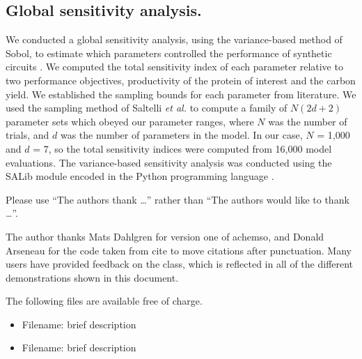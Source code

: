 \documentclass[journal=asbcd6,manuscript=article]{achemso}
\begin{document}
\subsection*{Global sensitivity analysis.}
We conducted a global sensitivity analysis, using the variance-based method of Sobol, to estimate which parameters controlled the performance of synthetic circuits \citep{SOBOL_METHOD}.
We computed the total sensitivity index of each parameter relative to two performance objectives, productivity of the protein of interest and the carbon yield.
We established the sampling bounds for each parameter from literature.
We used the sampling method of Saltelli \textit{et al.} \citep{Saltelli:2010} to compute a family of $N\left(2d+2\right)$ parameter sets which obeyed our parameter ranges,
where $N$ was the number of trials, and $d$ was the number of parameters in the model. In our case, $N$ = 1,000 and $d$ = 7, so the total sensitivity indices were computed from
16,000 model evaluations. The variance-based sensitivity analysis was conducted using the SALib module encoded in the Python programming language \citep{SALIB}.


\begin{acknowledgement}

Please use ``The authors thank \ldots'' rather than ``The
authors would like to thank \ldots''.

The author thanks Mats Dahlgren for version one of \textsf{achemso},
and Donald Arseneau for the code taken from \textsf{cite} to move
citations after punctuation. Many users have provided feedback on the
class, which is reflected in all of the different demonstrations
shown in this document.

\end{acknowledgement}

\begin{suppinfo}

The following files are available free of charge.
\begin{itemize}
  \item Filename: brief description
  \item Filename: brief description
\end{itemize}

\end{suppinfo}


\end{document}
